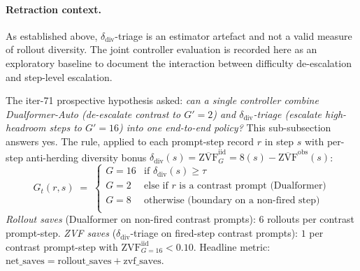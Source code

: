 \paragraph{Retraction context.}
As established above, $\delta_{\mathrm{div}}$-triage is an estimator artefact
and not a valid measure of rollout diversity. The joint controller evaluation
is recorded here as an exploratory baseline to document the interaction
between difficulty de-escalation and step-level escalation.

The iter-71 prospective hypothesis asked: \emph{can a single
controller combine Dualformer-Auto (de-escalate contrast to $G'{=}2$)
and $\delta_{\mathrm{div}}$-triage (escalate high-headroom steps to
$G'{=}16$) into one end-to-end policy?} This sub-subsection answers
yes. The rule, applied to each prompt-step record $r$ in step $s$ with
per-step anti-herding diversity bonus
$\delta_{\mathrm{div}}(s) = \overline{\mathrm{ZVF}}^{\mathrm{iid}}_G{=}8(s)
- \overline{\mathrm{ZVF}}^{\mathrm{obs}}(s)$:
\begin{equation*}
G_t(r, s) \;=\; \begin{cases}
G{=}16 & \text{if $\delta_{\mathrm{div}}(s) \geq \tau$} \\
G{=}2  & \text{else if $r$ is a contrast prompt (Dualformer)} \\
G{=}8  & \text{otherwise (boundary on a non-fired step)} \\
\end{cases}
\end{equation*}
\emph{Rollout saves} (Dualformer on non-fired contrast prompts):
$6$ rollouts per contrast prompt-step. \emph{ZVF saves}
($\delta_{\mathrm{div}}$-triage on fired-step contrast prompts):
$1$ per contrast prompt-step with $\mathrm{ZVF}^{\mathrm{iid}}_{G{=}16} < 0.10$.
Headline metric: $\mathrm{net\_saves} = \mathrm{rollout\_saves} +
\mathrm{zvf\_saves}$.

